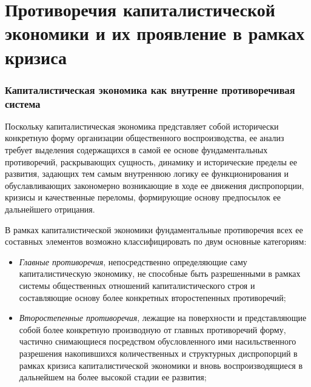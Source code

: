 \chapter{Противоречия капиталистической экономики и их проявление в рамках кризиса}
\label{app:dialectica}

\subsection{Капиталистическая экономика как внутренне противоречивая система}
Поскольку капиталистическая экономика представляет собой исторически конкретную форму организации общественного воспроизводства, ее анализ требует выделения содержащихся в самой ее основе фундаментальных противоречий, раскрывающих сущность, динамику и исторические пределы ее развития, задающих тем самым внутреннюю логику ее функционирования и обуславливающих закономерно возникающие в ходе ее движения диспропорции, кризисы и качественные переломы, формирующие основу предпосылок ее дальнейшего отрицания.

В рамках капиталистической экономики фундаментальные противоречия всех ее составных элементов возможно классифицировать по двум основные категориям:
\begin{itemize}
    \item \textit{Главные противоречия}, непосредственно определяющие саму капиталистическую экономику, не способные быть разрешенными в рамках системы общественных отношений капиталистического строя и составляющие основу более конкретных второстепенных противоречий;
    \item \textit{Второстепенные противоречия}, лежащие на поверхности и представляющие собой более конкретную производную от главных противоречий форму, частично снимающиеся посредством обусловленного ими насильственного разрешения накопившихся количественных и структурных диспропорций в рамках кризиса капиталистической экономики и вновь воспроизводящиеся в дальнейшем на более высокой стадии ее развития;
\end{itemize}

